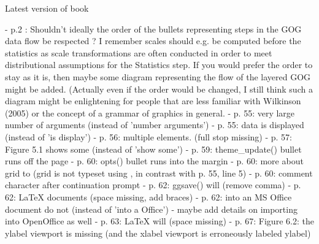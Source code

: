 Latest version of book

- p.2 : Shouldn't ideally the order of the bullets representing steps in
 the GOG data flow be respected ? I remember scales should e.g. be
 computed before the statistics as scale transformations are often
 conducted in order to meet distributional assumptions for the Statistics
 step. If you would prefer the order to stay as it is, then maybe some
 diagram representing the flow of the layered GOG might be added.
 (Actually even if the order would be changed, I still think such a diagram
 might be enlightening for people that are less familiar with Wilkinson (2005)
 or the concept of a grammar of graphics in general.
- p. 55: very large number of arguments (instead of 'number arguments')
- p. 55: data is displayed (instead of 'is display')
- p. 56: multiple elements. (full stop missing)
- p. 57: Figure 5.1 shows some (instead of 'show some')
- p. 59: theme_update() bullet runs off the page
- p. 60: opts() bullet runs into the margin
- p. 60: more about grid to (grid is not typeset using \texttt{}, in
contrast with p. 55, line 5)
- p. 60: comment character after continuation prompt
- p. 62: ggsave() will (remove comma)
- p. 62: \LaTeX{} documents (space missing, add braces)
- p. 62: into an MS Office document do not (instead of 'into a Office')
- maybe add details on importing into OpenOffice as well
- p. 63:  \LaTeX{} will (space missing)
- p. 67: Figure 6.2: the ylabel viewport is missing (and the xlabel viewport
 is erroneously labeled ylabel)
